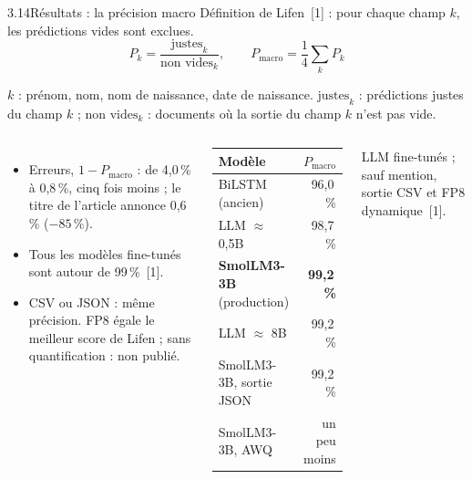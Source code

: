 \documentclass[11pt,aspectratio=169]{beamer}
\newcommand{\refs}[1]{{\color{mlblue}[#1]}}
\newcommand{\pct}[1]{#1\,\%}
\newcommand{\remarque}[1]{{\footnotesize\color{mlgray}#1\par}}
\begin{document}
\begin{frame}{3.14\quad Résultats : la précision macro}
  \small
  Définition de Lifen~\refs{1} : pour chaque champ $k$, les prédictions vides sont exclues.
  \[
    P_k = \frac{\text{justes}_k}{\text{non vides}_k}, \qquad
    P_{\text{macro}} = \frac{1}{4} \sum_{k} P_k
  \]
  \remarque{$k$ : prénom, nom, nom de naissance, date de naissance. $\text{justes}_k$ :
  prédictions justes du champ $k$ ; $\text{non vides}_k$ : documents où la sortie du champ
  $k$ n'est pas vide.}

  \vspace{0.4em}
  \begin{columns}[T]
    \begin{itemize}
      \item Erreurs, $1 - P_{\text{macro}}$ : de \pct{4,0} à \pct{0,8}, cinq fois moins ; le
        titre de l'article annonce \pct{0,6} ($-\pct{85}$).
      \item Tous les modèles fine-tunés sont autour de \pct{99}~\refs{1}.
      \item CSV ou JSON : même précision. FP8 égale le meilleur score de Lifen ; sans
        quantification : non publié.
    \end{itemize}
    {\small
    \renewcommand{\arraystretch}{1.1}
    \begin{tabular}{@{}lr@{}}
      \toprule
      \textbf{Modèle} & $P_{\text{macro}}$ \\
      \midrule
      BiLSTM (ancien) & \pct{96,0} \\
      LLM $\approx$ 0,5B & \pct{98,7} \\
      \textbf{SmolLM3-3B} (production) & \textbf{\pct{99,2}} \\
      LLM $\approx$ 8B & \pct{99,2} \\
      \midrule
      SmolLM3-3B, sortie JSON & \pct{99,2} \\
      SmolLM3-3B, AWQ & un peu moins \\
      \bottomrule
    \end{tabular}}

    \remarque{LLM fine-tunés ; sauf mention, sortie CSV et FP8 dynamique~\refs{1}.}
  \end{columns}
\end{frame}
\end{document}
